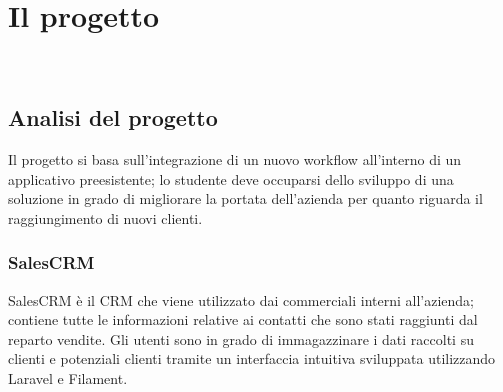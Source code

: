 \chapter{Il progetto}
\label{cap:descrizione-stage}

\\

\section{Analisi del progetto}

Il progetto si basa sull'integrazione di un nuovo workflow all'interno di un applicativo preesistente; lo studente deve occuparsi dello sviluppo di una soluzione in grado di migliorare la portata dell'azienda per quanto riguarda il raggiungimento di nuovi clienti.

\subsection{SalesCRM}
SalesCRM è il CRM che viene utilizzato dai commerciali interni all'azienda; contiene tutte le informazioni relative ai contatti che sono stati raggiunti dal reparto vendite. 
Gli utenti sono in grado di immagazzinare i dati raccolti su clienti e potenziali clienti tramite un interfaccia intuitiva sviluppata utilizzando Laravel e Filament.

